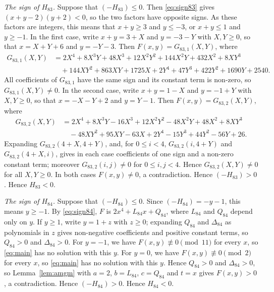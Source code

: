 \documentclass[11pt]{article}
\begin{document}
\emph{The sign of $H_{83}$.} Suppose that $(-H_{83})\leq0$. Then \eqref{eq:sign83} gives $(x+y-2)(y+2)<0$, so the two factors have opposite signs. As these factors are integers, this means that $x+y\geq3$ and $y\leq-3$, or $x+y\leq1$ and $y\geq-1$. In the first case, write $x+y=3+X$ and $y=-3-Y$ with $X,Y\geq0$, so that $x=X+Y+6$ and $y=-Y-3$. Then $F(x,y)=G_{83,1}(X,Y)$, where
\begin{align*}
G_{83,1}(X,Y)&=2X^{4}+8X^{3}Y+48X^{3}+12X^{2}Y^{2}+144X^{2}Y+432X^{2}+8XY^{3}\\
&\quad+144XY^{2}+863XY+1725X+2Y^{4}+47Y^{3}+422Y^{2}+1690Y+2540.
\end{align*}
All coefficients of $G_{83,1}$ have the same sign and its constant term is non-zero, so $G_{83,1}(X,Y)\neq0$. In the second case, write $x+y=1-X$ and $y=-1+Y$ with $X,Y\geq0$, so that $x=-X-Y+2$ and $y=Y-1$. Then $F(x,y)=G_{83,2}(X,Y)$, where
\begin{align*}
G_{83,2}(X,Y)&=2X^{4}+8X^{3}Y-16X^{3}+12X^{2}Y^{2}-48X^{2}Y+48X^{2}+8XY^{3}\\
&\quad-48XY^{2}+95XY-63X+2Y^{4}-15Y^{3}+44Y^{2}-56Y+26.
\end{align*}
Expanding $G_{83,2}(4+X,4+Y)$, and, for $0\leq i<4$, $G_{83,2}(i,4+Y)$ and $G_{83,2}(4+X,i)$, gives in each case coefficients of one sign and a non-zero constant term; moreover $G_{83,2}(i,j)\neq0$ for $0\leq i,j<4$. Hence $G_{83,2}(X,Y)\neq0$ for all $X,Y\geq0$. In both cases $F(x,y)\neq0$, a contradiction. Hence $(-H_{83})>0$. Hence $H_{83}<0$.

\emph{The sign of $H_{84}$.} Suppose that $(-H_{84})\leq0$. Since $(-H_{84})=-y-1$, this means $y\geq-1$. By \eqref{eq:sign84}, $F$ is $2x^4+L_{84}x+Q_{84}$, where $L_{84}$ and $Q_{84}$ depend only on $y$. If $y\geq1$, write $y=1+z$ with $z\geq0$; expanding $Q_{84}$ and $\Delta_{84}$ as polynomials in $z$ gives non-negative coefficients and positive constant terms, so $Q_{84}>0$ and $\Delta_{84}>0$. For $y=-1$, we have $F(x,y)\not\equiv0\pmod{11}$ for every $x$, so \eqref{eq:main} has no solution with this $y$. For $y=0$, we have $F(x,y)\not\equiv0\pmod{2}$ for every $x$, so \eqref{eq:main} has no solution with this $y$. Hence $Q_{84}>0$ and $\Delta_{84}>0$, so Lemma~\ref{lem:amgm} with $a=2$, $b=L_{84}$, $c=Q_{84}$ and $t=x$ gives $F(x,y)>0$, a contradiction. Hence $(-H_{84})>0$. Hence $H_{84}<0$.
\end{document}
